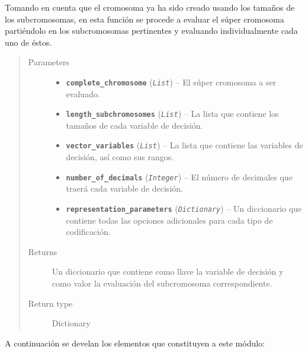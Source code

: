 \documentclass[letterpaper,10pt,english]{sphinxmanual}
\begin{document}
\begin{fulllineitems}
Tomando en cuenta que el cromosoma ya ha sido creado usando los tamaños de los subcromosomas,
en esta función se procede a evaluar el súper cromosoma partiéndolo en los subcromosomas pertinentes y evaluando
individualmente cada uno de éstos.
\begin{quote}\begin{description}
\item[{Parameters}] \leavevmode\begin{itemize}
\item {} 
\textbf{\texttt{complete\_chromosome}} (\emph{\texttt{List}}) -- El súper cromosoma a ser evaluado.

\item {} 
\textbf{\texttt{length\_subchromosomes}} (\emph{\texttt{List}}) -- La lista que contiene los tamaños de cada variable de decisión.

\item {} 
\textbf{\texttt{vector\_variables}} (\emph{\texttt{List}}) -- La lista que contiene las variables de decisión, así como sus rangos.

\item {} 
\textbf{\texttt{number\_of\_decimals}} (\emph{\texttt{Integer}}) -- El número de decimales que traerá cada variable de decisión.

\item {} 
\textbf{\texttt{representation\_parameters}} (\emph{\texttt{Dictionary}}) -- Un diccionario que contiene todas las opciones adicionales para cada tipo de
codificación.

\end{itemize}

\item[{Returns}] \leavevmode
Un diccionario que contiene como llave la variable de decisión y como valor la evaluación del
subcromosoma correspondiente.

\item[{Return type}] \leavevmode
Dictionary

\end{description}\end{quote}

\end{fulllineitems}


A continuación se develan los elementos que constituyen a este módulo:
\end{document}
